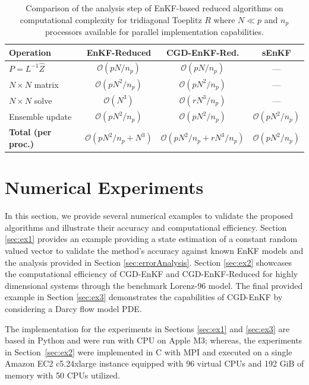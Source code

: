 \documentclass[11p]{elsarticle}
\numberwithin{equation}{section}
\begin{document}
  \begin{table}[ht]
  \centering
  \footnotesize 
  \caption{Comparison of the analysis step of EnKF-based reduced algorithms on computational complexity for tridiagonal Toeplitz $R$ where $N \ll p$ and $n_p$ processors available for parallel implementation capabilities.}
  \label{tab:complexity_impl}
  \begin{tabular}{l ccc}
  \hline
  \textbf{Operation}
    & \textbf{EnKF-Reduced}
    & \textbf{CGD-EnKF-Red.}
    & \textbf{sEnKF} \\
  \hline
  $P\!=\!L^{-1}\widehat{Z}$
    & $\mathcal{O}(pN/n_p)$
    & $\mathcal{O}(pN/n_p)$
    & --- \\
  $N\!\times\!N$ matrix
    & $\mathcal{O}(pN^2/n_p)$
    & $\mathcal{O}(pN^2/n_p)$
    & --- \\
  $N\!\times\!N$ solve
    & $\mathcal{O}(N^3)$
    & $\mathcal{O}(rN^3/n_p)$
    & --- \\
  Ensemble update
    & $\mathcal{O}(pN^2/n_p)$
    & $\mathcal{O}(pN^2/n_p)$
    & $\mathcal{O}(pN^2/n_p)$ \\
  \hline
  \textbf{Total (per proc.)}
    & $\mathcal{O}(pN^2/n_p\!+\!N^3)$
    & $\mathcal{O}(pN^2/n_p\!+\!rN^3/n_p)$
    & $\mathcal{O}(pN^2/n_p)$ \\
 
  \hline
  \end{tabular}
  \end{table}






\section{Numerical Experiments}
\label{sec:experiments}

In this section, we provide several numerical examples to validate the proposed algorithms and illustrate their accuracy and computational efficiency.  Section \ref{sec:ex1} provides an example providing a state estimation of a constant random valued vector to validate the method's accuracy against known EnKF models and the analysis provided in Section \ref{sec:errorAnalysis}.  Section \ref{sec:ex2} showcases the computational efficiency of CGD-EnKF and CGD-EnKF-Reduced for highly dimensional systems through the benchmark Lorenz-96 model.  The final provided example in Section \ref{sec:ex3} demonstrates the capabilities of CGD-EnKF by considering a Darcy flow model PDE.

The implementation for the experiments in Sections \ref{sec:ex1} and \ref{sec:ex3} are based in Python and were run with CPU on Apple M3; whereas, {the experiments in Section~\ref{sec:ex2}
were implemented in C with MPI and executed on a single Amazon EC2
c5.24xlarge instance equipped with 96 virtual CPUs and 192 GiB of
memory with 50 CPUs utilized.}
\end{document}
